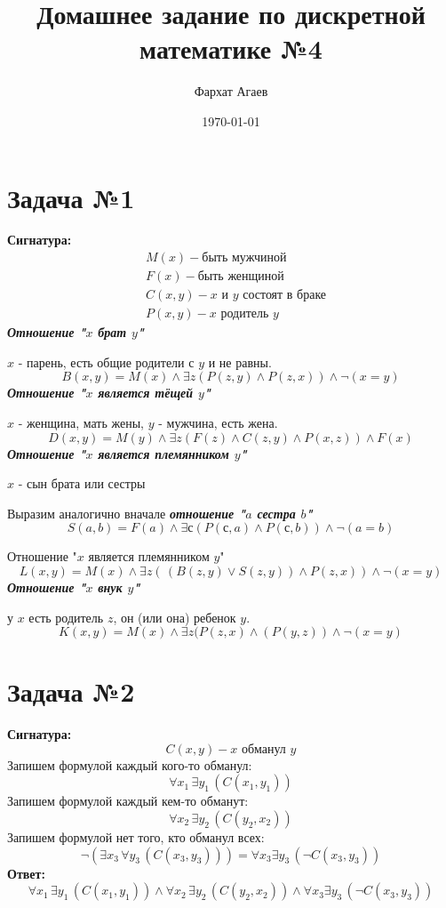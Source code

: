 \documentclass[a4paper,12pt]{article} %
\author{Фархат Агаев}
\title{Домашнее задание по дискретной математике №4}
\date{\today}
\begin{document}

\maketitle


\section*{Задача №1} 
\textbf{Сигнатура:}
\begin{align*}
    &M(x) - \text{быть мужчиной} \\
    &F(x) - \text{быть женщиной} \\
    &C(x, y) - \text{$x$ и $y$ состоят в браке} \\
    &P(x, y) - \text{$x$ родитель $y$}
\end{align*}
\textbf{\textit{Отношение 
"$x$ брат $y$"}}

$x$ - парень, есть общие родители с $y$ и не равны.
\[B(x, y) = M(x) \wedge \exists z (P(z, y) \wedge P(z, x))
 \wedge \neg(x = y)\]
\textbf{\textit{Отношение 
"$x$ является тёщей $y$"}}

$x$ - женщина, мать жены,
$y$ - мужчина, есть жена. 
\[
    D(x, y) = M(y) \wedge
    \exists z (F(z) \wedge C(z, y) \wedge P(x, z))
    \wedge F(x) 
\]
\textbf{\textit{Отношение 
"$x$ является племянником $y$"}}

$x$ - сын брата или сестры

Выразим аналогично вначале \textbf{\textit{отношение "$a$ сестра $b$"}}
\[S(a, b) = F(a) \wedge \exists с(P(с, a) \wedge P(с, b))
 \wedge \neg(a = b)\]
 
 Отношение "$x$ является племянником $y$"
\[L(x, y) = M(x) \wedge
 \exists z(\,(B(z, y) \vee S(z, y)) \wedge P(z, x)) 
 \wedge \neg (x = y) \]
\textbf{\textit{Отношение 
"$x$ внук $y$"}}

у $x$ есть родитель $z$, он (или она) ребенок $y$.
\[K(x, y) = M(x)  \wedge  \exists z(P(z,x) \wedge (P(y,z)) \wedge \neg (x = y) \]


\section*{Задача №2} 
\textbf{Сигнатура:}
\[C(x, y) - x \text{ обманул } y\]
Запишем формулой каждый кого-то обманул:
\[\forall x_1 \, \exists y_1 \, (C(x_1, y_1))\]
Запишем формулой каждый кем-то обманут:
\[\forall  x_2\, \exists  y_2 \, (C(y_2, x_2))\]
Запишем формулой нет того, кто обманул всех:
\[\neg (\exists  x_3\, \forall  y_3 \, 
(C(x_3, y_3))) = \forall x_3 \exists y_3 \,(\neg C(x_3, y_3))\]
\textbf{Ответ:}
\[\forall x_1 \, \exists y_1 \, (C(x_1, y_1)) \wedge 
\forall  x_2\, \exists  y_2 \, (C(y_2, x_2)) \wedge
\forall x_3 \exists y_3 \,(\neg C(x_3, y_3))
    \]
    
\end{document}
